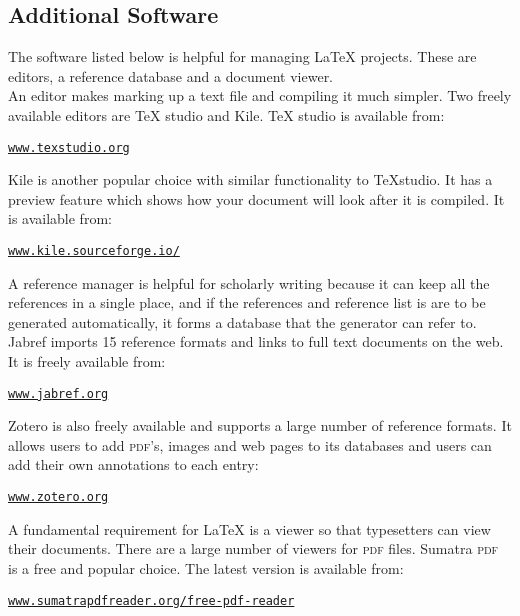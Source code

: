 \documentclass[12pt, a4paper]{article}
\begin{document}
\subsection{Additional Software}

The software listed below is helpful for managing LaTeX projects. These are editors, a reference database and a document viewer. \\

An editor makes marking up a text file and compiling it much simpler. Two freely available editors are TeX studio and Kile. TeX studio is available from: 

\begin{flushleft}
\texttt{\url{www.texstudio.org}}
\end{flushleft}

Kile is another popular choice with similar functionality to TeXstudio. It has a preview feature which shows how your document will look after it is compiled. It is available from:

\begin{flushleft}
\texttt{\url{www.kile.sourceforge.io/}}
\end{flushleft}

A reference manager is helpful for scholarly writing because it can keep all the references in a single place, and if the references and reference list is are to be generated automatically, it forms a database that the generator can refer to. Jabref imports 15 reference formats and links to full text documents on the web. It is freely available from:

\begin{flushleft}
\texttt{\url{www.jabref.org}}
\end{flushleft}

Zotero is also freely available and supports a large number of reference formats. It allows users to add \textsc{pdf}'s, images and web pages to its databases and users can add their own annotations to each entry:

\begin{flushleft}
\texttt{\url{www.zotero.org}}
\end{flushleft}


A fundamental requirement for LaTeX is a viewer so that typesetters can view their documents. There are a large number of viewers for \textsc{pdf} files. Sumatra \textsc{pdf} is a free and popular choice. The latest version is available from:


\begin{flushleft}
\texttt{\url{www.sumatrapdfreader.org/free-pdf-reader}}
\end{flushleft}
\end{document}

